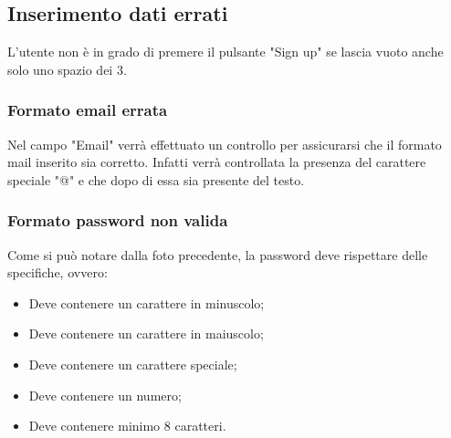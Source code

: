 {\subsection{Inserimento dati errati} {
L'utente non è in grado di premere il pulsante "Sign up" se lascia vuoto anche solo uno spazio dei 3.

    \subsubsection{Formato email errata} {
        Nel campo "Email" verrà effettuato un controllo per assicurarsi che il formato mail inserito sia corretto.
        Infatti verrà controllata la presenza del carattere speciale "@" e che dopo di essa sia presente del testo.
    }
    
    \subsubsection{Formato password non valida} {
        Come si può notare dalla foto precedente, la password deve rispettare delle specifiche, ovvero:
        \begin{itemize}
            \item Deve contenere un carattere in minuscolo;
            \item Deve contenere un carattere in maiuscolo;
            \item Deve contenere un carattere speciale;
            \item Deve contenere un numero;
            \item Deve contenere minimo 8 caratteri.
        \end{itemize}
    }
}


}
